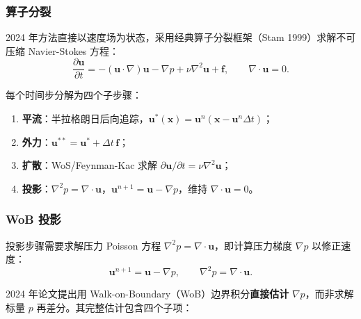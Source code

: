 \documentclass[12pt,a4paper]{article}
\begin{document}
\subsubsection{算子分裂}

2024 年方法直接以速度场为状态，采用经典算子分裂框架（Stam 1999）求解不可压缩 Navier-Stokes 方程：
\begin{equation}
\frac{\partial\boldsymbol{u}}{\partial t} = -(\boldsymbol{u}\cdot\nabla)\boldsymbol{u} - \nabla p + \nu\nabla^2\boldsymbol{u} + \boldsymbol{f}, \qquad \nabla\cdot\boldsymbol{u}=0.
\end{equation}

每个时间步分解为四个子步骤：
\begin{enumerate}[label=(\arabic*)]
    \item \textbf{平流}：半拉格朗日后向追踪，$\boldsymbol{u}^*(\boldsymbol{x}) = \boldsymbol{u}^n(\boldsymbol{x}-\boldsymbol{u}^n\Delta t)$；
    \item \textbf{外力}：$\boldsymbol{u}^{**} = \boldsymbol{u}^* + \Delta t\,\boldsymbol{f}$；
    \item \textbf{扩散}：WoS/Feynman-Kac 求解 $\partial\boldsymbol{u}/\partial t = \nu\nabla^2\boldsymbol{u}$；
    \item \textbf{投影}：$\nabla^2 p = \nabla\cdot\boldsymbol{u}$，$\boldsymbol{u}^{n+1} = \boldsymbol{u} - \nabla p$，维持 $\nabla\cdot\boldsymbol{u}=0$。
\end{enumerate}

\subsubsection{WoB 投影}

投影步骤需要求解压力 Poisson 方程 $\nabla^2 p = \nabla\cdot\boldsymbol{u}$，即计算压力梯度 $\nabla p$ 以修正速度：
\begin{equation}
\boldsymbol{u}^{n+1} = \boldsymbol{u} - \nabla p, \qquad \nabla^2 p = \nabla\cdot\boldsymbol{u}.
\end{equation}

2024 年论文提出用 Walk-on-Boundary（WoB）边界积分\textbf{直接估计} $\nabla p$，而非求解标量 $p$ 再差分。其完整估计包含四个子项：
\end{document}
